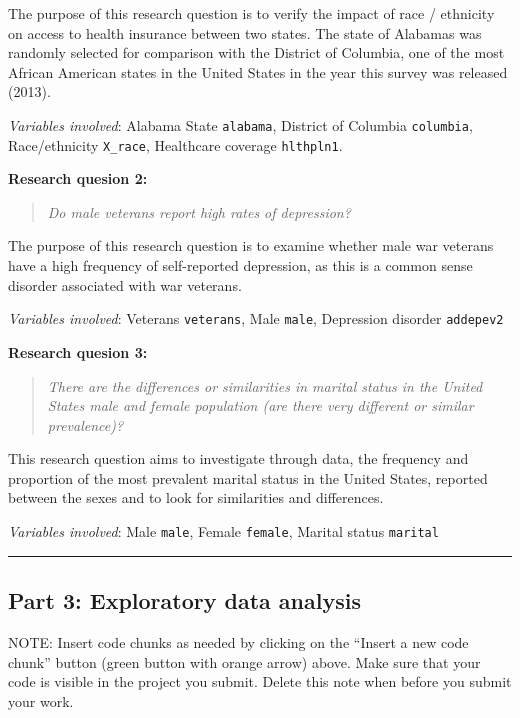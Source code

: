 \documentclass[]{article}
\begin{document}
The purpose of this research question is to verify the impact of race /
ethnicity on access to health insurance between two states. The state of
Alabamas was randomly selected for comparison with the District of
Columbia, one of the most African American states in the United States
in the year this survey was released (2013).

\emph{Variables involved}: Alabama State \texttt{alabama}, District of
Columbia \texttt{columbia}, Race/ethnicity \texttt{X\_race}, Healthcare
coverage \texttt{hlthpln1}.

\textbf{Research quesion 2:}

\begin{quote}
\emph{Do male veterans report high rates of depression?}
\end{quote}

The purpose of this research question is to examine whether male war
veterans have a high frequency of self-reported depression, as this is a
common sense disorder associated with war veterans.

\emph{Variables involved}: Veterans \texttt{veterans}, Male
\texttt{male}, Depression disorder \texttt{addepev2}

\textbf{Research quesion 3:}

\begin{quote}
\emph{There are the differences or similarities in marital status in the
United States male and female population (are there very different or
similar prevalence)?}
\end{quote}

This research question aims to investigate through data, the frequency
and proportion of the most prevalent marital status in the United
States, reported between the sexes and to look for similarities and
differences.

\emph{Variables involved}: Male \texttt{male}, Female \texttt{female},
Marital status \texttt{marital}

\begin{center}\rule{0.5\linewidth}{\linethickness}\end{center}

\hypertarget{part-3-exploratory-data-analysis}{%
\subsection{Part 3: Exploratory data
analysis}\label{part-3-exploratory-data-analysis}}

NOTE: Insert code chunks as needed by clicking on the ``Insert a new
code chunk'' button (green button with orange arrow) above. Make sure
that your code is visible in the project you submit. Delete this note
when before you submit your work.
\end{document}
